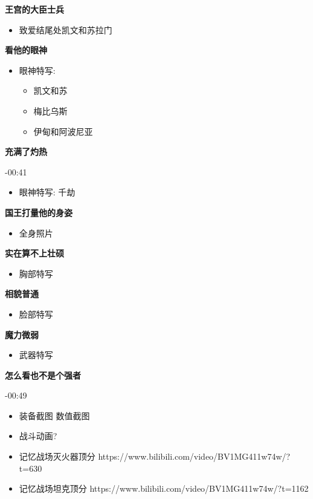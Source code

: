 \documentclass[a4paper]{article}
\begin{document}
\textbf{王宫的大臣士兵}

\begin{itemize}
    \item 致爱结尾处凯文和苏拉门
\end{itemize}

\textbf{看他的眼神}

\begin{itemize}
    \item 眼神特写:
    \begin{itemize}
        \item 凯文和苏
        \item 梅比乌斯
        \item 伊甸和阿波尼亚
    \end{itemize}
\end{itemize}

\textbf{充满了灼热}

-00:41

\begin{itemize}
    \item 眼神特写: 千劫
\end{itemize}

\textbf{国王打量他的身姿}

\begin{itemize}
    \item 全身照片
\end{itemize}

\textbf{实在算不上壮硕}

\begin{itemize}
    \item 胸部特写
\end{itemize}

\textbf{相貌普通}

\begin{itemize}
    \item 脸部特写
\end{itemize}

\textbf{魔力微弱}

\begin{itemize}
    \item 武器特写
\end{itemize}

\textbf{怎么看也不是个强者}

-00:49

\begin{itemize}
    \item 装备截图 数值截图
    \item 战斗动画?
    \item 记忆战场灭火器顶分 https://www.bilibili.com/video/BV1MG411w74w/?t=630
    \item 记忆战场坦克顶分 https://www.bilibili.com/video/BV1MG411w74w/?t=1162
\end{itemize}
\end{document}
